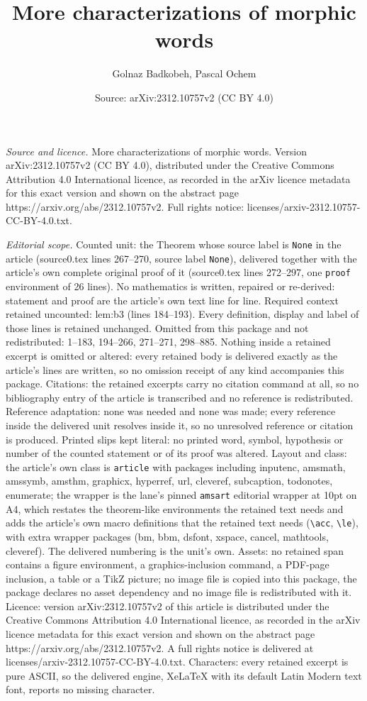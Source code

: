 \documentclass[10pt,a4paper]{amsart}
\title[More characterizations of morphic words]{More characterizations of morphic words}
\author{Golnaz Badkobeh, Pascal Ochem}
\date{Source: arXiv:2312.10757v2 (CC BY 4.0)}
\begin{document}
\maketitle

\noindent\emph{Source and licence.} More characterizations of morphic words. Version arXiv:2312.10757v2 (CC BY 4.0), distributed under the Creative Commons Attribution 4.0 International licence, as recorded in the arXiv licence metadata for this exact version and shown on the abstract page https://arxiv.org/abs/2312.10757v2. Full rights notice: licenses/arxiv-2312.10757-CC-BY-4.0.txt.\par\smallskip

\noindent\textit{Editorial scope.} Counted unit: the Theorem whose source label is \texttt{None} in the article (source0.tex lines 267--270, source label \texttt{None}), delivered together with the article's own complete original proof of it (source0.tex lines 272--297, one \texttt{proof} environment of 26 lines). No mathematics is written, repaired or re-derived: statement and proof are the article's own text line for line. Required context retained uncounted: lem:b3 (lines 184--193). Every definition, display and label of those lines is retained unchanged. Omitted from this package and not redistributed: 1--183, 194--266, 271--271, 298--885. Nothing inside a retained excerpt is omitted or altered: every retained body is delivered exactly as the article's lines are written, so no omission receipt of any kind accompanies this package. Citations: the retained excerpts carry no citation command at all, so no bibliography entry of the article is transcribed and no reference is redistributed. Reference adaptation: none was needed and none was made; every reference inside the delivered unit resolves inside it, so no unresolved reference or citation is produced. Printed slips kept literal: no printed word, symbol, hypothesis or number of the counted statement or of its proof was altered. Layout and class: the article's own class is \texttt{article} with packages including inputenc, amsmath, amssymb, amsthm, graphicx, hyperref, url, cleveref, subcaption, todonotes, enumerate; the wrapper is the lane's pinned \texttt{amsart} editorial wrapper at 10pt on A4, which restates the theorem-like environments the retained text needs and adds the article's own macro definitions that the retained text needs (\texttt{\textbackslash acc}, \texttt{\textbackslash le}), with extra wrapper packages (bm, bbm, dsfont, xspace, cancel, mathtools, cleveref). The delivered numbering is the unit's own. Assets: no retained span contains a figure environment, a graphics-inclusion command, a PDF-page inclusion, a table or a TikZ picture; no image file is copied into this package, the package declares no asset dependency and no image file is redistributed with it. Licence: version arXiv:2312.10757v2 of this article is distributed under the Creative Commons Attribution 4.0 International licence, as recorded in the arXiv licence metadata for this exact version and shown on the abstract page https://arxiv.org/abs/2312.10757v2. A full rights notice is delivered at licenses/arxiv-2312.10757-CC-BY-4.0.txt. Characters: every retained excerpt is pure ASCII, so the delivered engine, XeLaTeX with its default Latin Modern text font, reports no missing character.
\end{document}
